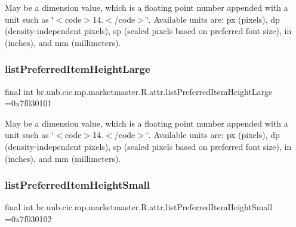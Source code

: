 May be a dimension value, which is a floating point number appended with a unit such as \char`\"{}$<$code$>$14.\+5sp$<$/code$>$\char`\"{}. Available units are\+: px (pixels), dp (density-\/independent pixels), sp (scaled pixels based on preferred font size), in (inches), and mm (millimeters). \mbox{\label{classbr_1_1unb_1_1cic_1_1mp_1_1marketmaster_1_1R_1_1attr_a67eadc33b64b51960226da682555cab8}} 
\subsubsection{\texorpdfstring{list\+Preferred\+Item\+Height\+Large}{listPreferredItemHeightLarge}}
{\footnotesize\ttfamily final int br.\+unb.\+cic.\+mp.\+marketmaster.\+R.\+attr.\+list\+Preferred\+Item\+Height\+Large =0x7f030101\hspace{0.3cm}{\ttfamily [static]}}

May be a dimension value, which is a floating point number appended with a unit such as \char`\"{}$<$code$>$14.\+5sp$<$/code$>$\char`\"{}. Available units are\+: px (pixels), dp (density-\/independent pixels), sp (scaled pixels based on preferred font size), in (inches), and mm (millimeters). \mbox{\label{classbr_1_1unb_1_1cic_1_1mp_1_1marketmaster_1_1R_1_1attr_a9cd35c2a1ac15d4c207da8210e54e580}} 
\subsubsection{\texorpdfstring{list\+Preferred\+Item\+Height\+Small}{listPreferredItemHeightSmall}}
{\footnotesize\ttfamily final int br.\+unb.\+cic.\+mp.\+marketmaster.\+R.\+attr.\+list\+Preferred\+Item\+Height\+Small =0x7f030102\hspace{0.3cm}{\ttfamily [static]}}

